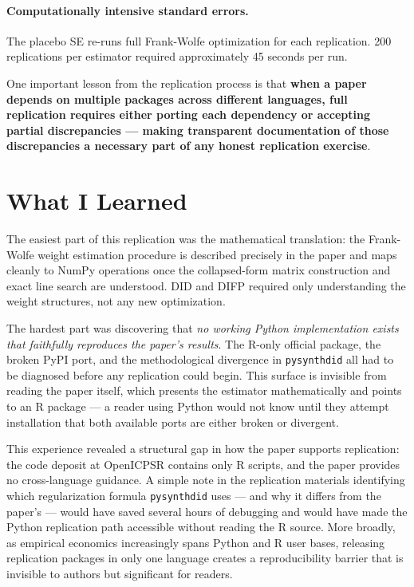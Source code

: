 \documentclass[12pt]{article}
\begin{document}
\paragraph{Computationally intensive standard errors.}
The placebo SE re-runs full Frank-Wolfe optimization for each replication.
200 replications per estimator required approximately 45 seconds per run.

One important lesson from the replication process is that \textbf{when a paper
depends on multiple packages across different languages, full replication
requires either porting each dependency or accepting partial discrepancies ---
making transparent documentation of those discrepancies a necessary part
of any honest replication exercise}.

\section{What I Learned}

The easiest part of this replication was the mathematical translation: the
Frank-Wolfe weight estimation procedure is described precisely in the paper and
maps cleanly to NumPy operations once the collapsed-form matrix construction
and exact line search are understood.
DID and DIFP required only understanding the weight structures, not
any new optimization.

The hardest part was discovering that \emph{no working Python implementation
exists that faithfully reproduces the paper's results}.
The R-only official package, the broken PyPI port, and the methodological
divergence in \texttt{pysynthdid} all had to be diagnosed before any
replication could begin.
This surface is invisible from reading the paper itself, which presents the
estimator mathematically and points to an R package --- a reader using Python
would not know until they attempt installation that both available ports are
either broken or divergent.

This experience revealed a structural gap in how the paper supports replication:
the code deposit at OpenICPSR contains only R scripts, and the paper provides no
cross-language guidance.
A simple note in the replication materials identifying which regularization
formula \texttt{pysynthdid} uses --- and why it differs from the paper's ---
would have saved several hours of debugging and would have made the Python
replication path accessible without reading the R source.
More broadly, as empirical economics increasingly spans Python and R user bases,
releasing replication packages in only one language creates a reproducibility
barrier that is invisible to authors but significant for readers.



\end{document}
